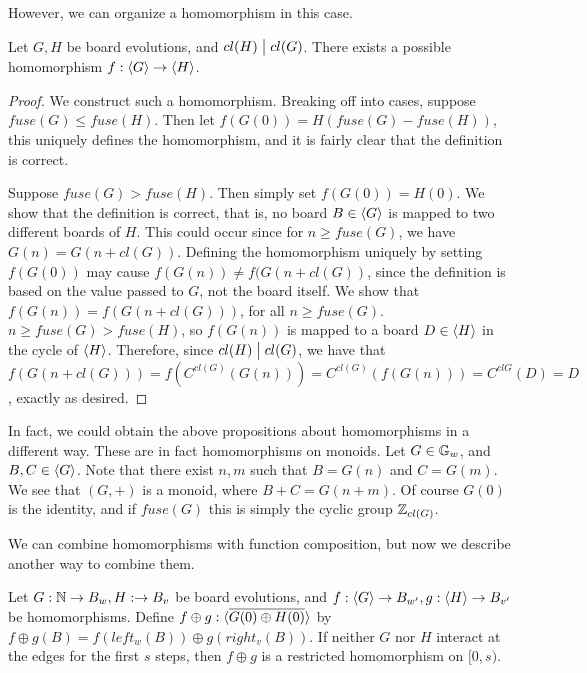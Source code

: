 \documentclass[12pt,letterpaper]{article}
\begin{document}
However, we can organize a homomorphism in this case.
\begin{prop}\label{divisibilityImplyHomomorphism}
  Let $G,H$ be board evolutions, and $cl(H)\bigm| cl(G)$. There exists a possible homomorphism $f:\langle G\rangle\rightarrow \langle H\rangle$.
\end{prop}
\begin{proof}
  We construct such a homomorphism. Breaking off into cases, suppose $fuse(G)\leq fuse(H)$. Then let $f(G(0))=H(fuse(G)-fuse(H))$, this uniquely defines the homomorphism, and it is fairly clear that the definition is correct.
  
  Suppose $fuse(G)>fuse(H)$. Then simply set $f(G(0))=H(0)$. We show that the definition is correct, that is, no board $B\in\langle G\rangle$ is mapped to two different boards of $H$. This could occur since for $n\geq fuse(G)$, we have $G(n)=G(n+cl(G))$. Defining the homomorphism uniquely by setting $f(G(0))$ may cause $f(G(n))\neq f(G(n+cl(G))$, since the definition is based on the value passed to $G$, not the board itself.
  We show that $f(G(n))=f(G(n+cl(G)))$, for all $n\geq fuse(G)$. $n\geq fuse(G)>fuse(H)$, so $f(G(n))$ is mapped to a board $D\in\langle H\rangle$ in the cycle of $\langle H\rangle$. Therefore, since $cl(H)\bigm| cl(G)$, we have that $f(G(n+cl(G)))=f(C^{cl(G)}(G(n)))=C^{cl(G)}(f(G(n)))=C^{cl{G}}(D)=D$, exactly as desired. 
\end{proof}

In fact, we could obtain the above propositions about homomorphisms in a different way. These are in fact homomorphisms on monoids. Let $G\in \mathbb{G}_w$, and $B,C\in \langle G\rangle$. Note that there exist $n,m$ such that $B=G(n)$ and $C=G(m)$. We see that $(G,+)$ is a monoid, where $B+C=G(n+m)$. Of course $G(0)$ is the identity, and if $fuse(G)$ this is simply the cyclic group $\mathbb{Z}_{cl(G)}$. 

We can combine homomorphisms with function composition, but now we describe another way to combine them.
\begin{prop}\label{appendHomomorphisms}
  Let $G:\mathbb{N}\rightarrow B_w,H:\rightarrow B_v$ be board evolutions, and $f:\langle G\rangle\rightarrow B_{w'}, g:\langle H\rangle\rightarrow B_{v'}$ be homomorphisms.
  Define $f\oplus g:\langle\overline{G(0)\oplus H(0)}\rangle$ by $f\oplus g(B)=f(left_w(B))\oplus g(right_v(B))$. If neither $G$ nor $H$ interact at the edges for the first $s$ steps, then $f\oplus g$ is a restricted homomorphism on $[0,s)$.
\end{prop}
\end{document}
